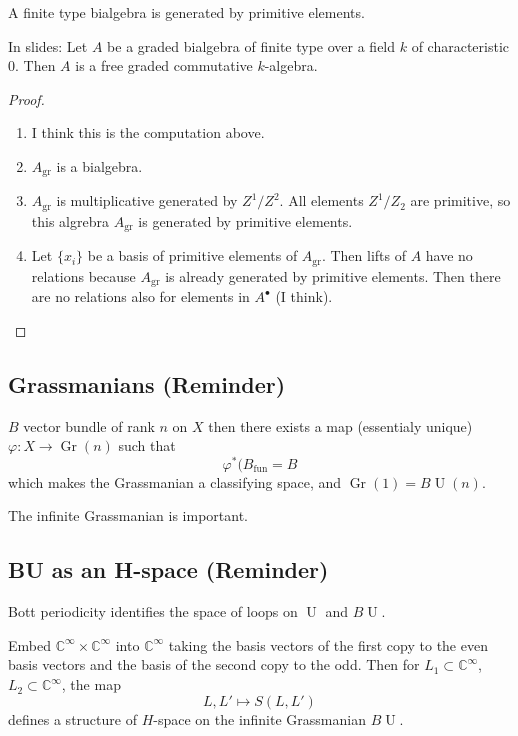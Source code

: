 \begin{thm}\leavevmode
	A finite type bialgebra is generated by primitive elements.

	In slides: Let $A$ be a graded bialgebra of finite type over a field $k$ of characteristic 0. Then $A$ is a free graded commutative $k$-algebra.
\end{thm}

\begin{proof}\leavevmode 
	\begin{enumerate}[label=\textbf{Step \arabic*}]
		\item I think this is the computation above.

		\item $A_{\operatorname{gr}}$ is a bialgebra.

		\item $A_{\operatorname{gr}}$ is multiplicative generated by $Z^1/Z^2$. All elements $Z^1/Z_2$ are primitive, so this algrebra $A_{\operatorname{gr}}$ is generated by primitive elements.

		\item Let $\{x_i\}$ be a basis of primitive elements of $A_{\operatorname{gr}}$. Then lifts of $A$ have no relations because $A_{\operatorname{gr}}$ is already generated by primitive elements. Then there are no relations also for elements in $A^\bullet$ (I think).
	\end{enumerate}
\end{proof}

\subsection{Grassmanians (Reminder)}

$B$ vector bundle of rank $n$ on $X$ then there exists a map (essentialy unique) $\varphi:X\to \operatorname{Gr}(n)$ such that
\[\varphi^* (B_{\operatorname{fun}}=B\]
which makes the Grassmanian a classifying space, and $\operatorname{Gr}(1)=B\operatorname{U}(n)$.

The infinite Grassmanian is important.

\subsection{BU as an H-space (Reminder)}

Bott periodicity identifies the space of loops on $\operatorname{U}$ and $B\operatorname{U}$.

\begin{prop}
	Embed $\mathbb{C}^{\infty}\times \mathbb{C}^\infty$ into $\mathbb{C}^\infty$ taking the basis vectors of the first copy to the even basis vectors and the basis of the second copy to the odd. Then for $L_1\subset \mathbb{C}^\infty$, $L_2\subset \mathbb{C}^\infty$, the map
	\[L,L'\mapsto S(L,L')\]
	defines a structure of $H$-space on the infinite Grassmanian $B\operatorname{U}$.
\end{prop}

